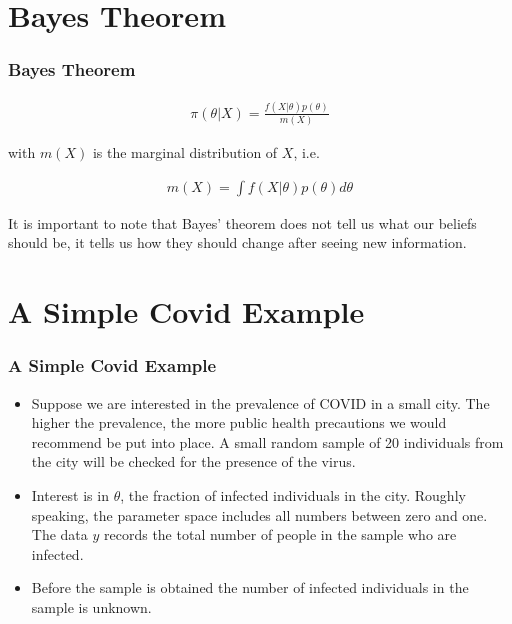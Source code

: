 \documentclass[
  shownotes,
  xcolor={svgnames},
  hyperref={colorlinks,citecolor=DarkBlue,linkcolor=DarkRed,urlcolor=DarkBlue}
  ]{beamer}
\begin{document}
\section{Bayes Theorem}
\begin{frame}[fragile]
\frametitle{Bayes Theorem}


\bigskip
\begin{align}
\pi (\theta|X)=\frac{f(X|\theta)p(\theta)}{m(X)}
\end{align}

\bigskip
with $m(X)$ is the marginal distribution of $X$, i.e.

\begin{align}
m(X)=\int f(X|\theta)p(\theta)d\theta
\end{align}

It is important to note that Bayes' theorem  does not tell us what our beliefs should be, it tells us how they should change after seeing new information.
\end{frame}

\section{A Simple Covid Example}
\begin{frame}[fragile]
\frametitle{A Simple Covid Example}
\begin{itemize}
\item Suppose we are interested in the prevalence of COVID in a small city. The higher the prevalence, the more public health precautions we would recommend be put into place. A small random sample of 20 individuals from the city will be checked for the presence of the virus.
\medskip
\item Interest is in $\theta$, the fraction of infected individuals in the city. Roughly speaking, the parameter space includes all numbers between zero and one. The data $y$ records the total number of people in the sample who are infected.
\medskip
\item Before the sample is obtained the number of infected individuals in the sample is unknown.
\end{itemize}


\end{frame}
\end{document}
